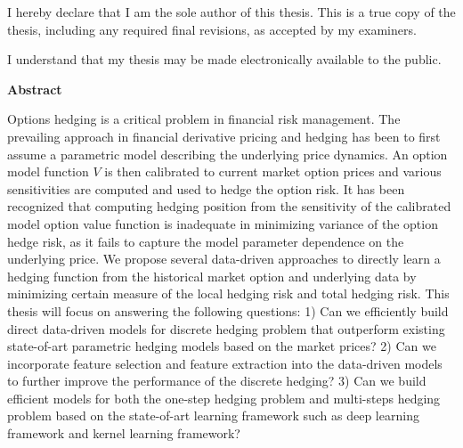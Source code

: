 
\cleardoublepage

  \noindent
I hereby declare that I am the sole author of this thesis. This is a true copy of the thesis, including any required final revisions, as accepted by my examiners.

  \bigskip

  \noindent
I understand that my thesis may be made electronically available to the public.

\cleardoublepage


\begin{center}\textbf{Abstract}\end{center}
Options hedging is a critical problem in financial risk management. The prevailing approach in financial derivative pricing and hedging has been to first assume a parametric model describing the underlying price dynamics.  An option model function $V$ is then calibrated to current  market option prices and various sensitivities are computed and  used to hedge the option risk.  It has been recognized that computing hedging position from the sensitivity of the calibrated model option value function is inadequate in minimizing variance of the option hedge risk, as it fails to capture the model parameter dependence on the underlying price.
We propose several data-driven approaches to directly learn a hedging function from the historical market option and underlying data by minimizing certain measure of the local hedging risk and total hedging risk. This thesis will focus on answering the following questions: 1) Can we efficiently build direct data-driven models for discrete hedging problem that outperform existing state-of-art parametric hedging models based on the market prices? 2) Can we incorporate feature selection and feature extraction into the data-driven models to further improve the performance of the discrete hedging? 3) Can we build efficient models for both the one-step hedging problem and multi-steps hedging problem based on the state-of-art learning framework such as deep learning framework and kernel learning framework?

